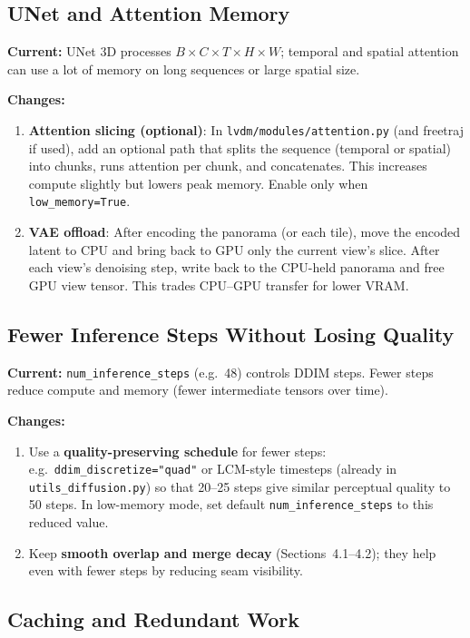 \documentclass[11pt,a4paper]{article}
\newcommand{\file}[1]{\texttt{#1}}
\newcommand{\fn}[1]{\texttt{#1}}
\begin{document}
\subsection{UNet and Attention Memory}

\textbf{Current:} UNet 3D processes $B\times C\times T\times H\times W$; temporal and spatial attention can use a lot of memory on long sequences or large spatial size.

\textbf{Changes:}
\begin{enumerate}
    \item \textbf{Attention slicing (optional)}: In \file{lvdm/modules/attention.py} (and freetraj if used), add an optional path that splits the sequence (temporal or spatial) into chunks, runs attention per chunk, and concatenates. This increases compute slightly but lowers peak memory. Enable only when \fn{low\_memory=True}.
    \item \textbf{VAE offload}: After encoding the panorama (or each tile), move the encoded latent to CPU and bring back to GPU only the current view’s slice. After each view’s denoising step, write back to the CPU-held panorama and free GPU view tensor. This trades CPU–GPU transfer for lower VRAM.
\end{enumerate}

\subsection{Fewer Inference Steps Without Losing Quality}

\textbf{Current:} \fn{num\_inference\_steps} (e.g.\ 48) controls DDIM steps. Fewer steps reduce compute and memory (fewer intermediate tensors over time).

\textbf{Changes:}
\begin{enumerate}
    \item Use a \textbf{quality-preserving schedule} for fewer steps: e.g.\ \fn{ddim\_discretize="quad"} or LCM-style timesteps (already in \file{utils\_diffusion.py}) so that 20--25 steps give similar perceptual quality to 50 steps. In low-memory mode, set default \fn{num\_inference\_steps} to this reduced value.
    \item Keep \textbf{smooth overlap and merge decay} (Sections~4.1--4.2); they help even with fewer steps by reducing seam visibility.
\end{enumerate}

\subsection{Caching and Redundant Work}
\end{document}
